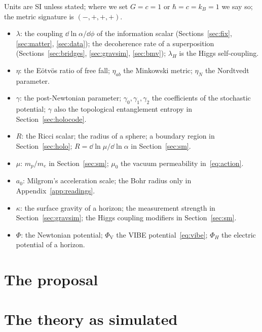 \documentclass[11pt,a4paper]{article}
\begin{document}
\begin{tcolorbox}[breakable,enhanced,colback=black!3,colframe=black!45,boxrule=0.5pt,arc=1pt,fonttitle=\bfseries\small,
title={Box 2: symbols that carry more than one meaning}]\small
Units are SI unless stated; where we set $G=c=1$ or $\hbar=c=k_B=1$ we say so; the metric signature is $(-,+,+,+)$.
\begin{itemize}[nosep]
\item $\lambda$: the coupling $\dd\ln\alpha/\dd\phi$ of the information scalar (Sections~\ref{sec:fix}, \ref{sec:matter}, \ref{sec:data});
the decoherence rate of a superposition (Sections~\ref{sec:bridges}, \ref{sec:gravsim}, \ref{sec:bmv}); $\lambda_H$ is the Higgs
self-coupling.
\item $\eta$: the E\"otv\"os ratio of free fall; $\eta_{ab}$ the Minkowski metric; $\eta_N$ the Nordtvedt parameter.
\item $\gamma$: the post-Newtonian parameter; $\gamma_0,\gamma_1,\gamma_2$ the coefficients of the stochastic potential; $\gamma$ also the
topological entanglement entropy in Section~\ref{sec:holocode}.
\item $R$: the Ricci scalar; the radius of a sphere; a boundary region in Section~\ref{sec:holo}; $R=\dd\ln\mu/\dd\ln\alpha$ in
Section~\ref{sec:sm}.
\item $\mu$: $m_p/m_e$ in Section~\ref{sec:sm}; $\mu_0$ the vacuum permeability in~\eqref{eq:action}.
\item $a_0$: Milgrom's acceleration scale; the Bohr radius only in Appendix~\ref{app:readings}.
\item $\kappa$: the surface gravity of a horizon; the measurement strength in Section~\ref{sec:gravsim}; the Higgs coupling modifiers
in Section~\ref{sec:sm}.
\item $\Phi$: the Newtonian potential; $\Phi_{\mathrm V}$ the VIBE potential~\eqref{eq:vibe}; $\Phi_H$ the electric potential of a horizon.
\end{itemize}
\end{tcolorbox}

\part{The proposal}\label{part:proposal}


\part{The theory as simulated}\label{part:simulated}




\end{document}
